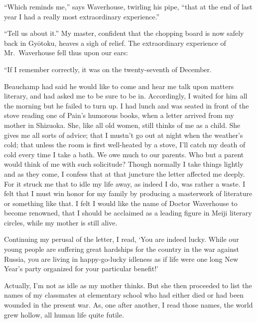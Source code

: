 \documentclass{book}
\begin{document}
``Which reminds me,'' says Waverhouse, twirling his pipe, ``that at the
end of last year I had a really most extraordinary experience.''

``Tell us about it.'' My master, confident that the chopping board is
now safely back in Gyōtoku, heaves a sigh of relief. The extraordinary
experience of Mr.~Waverhouse fell thus upon our ears:

``If I remember correctly, it was on the twenty-seventh of December.

Beauchamp had said he would like to come and hear me talk upon matters
literary, and had asked me to be sure to be in. Accordingly, I waited
for him all the morning but he failed to turn up. I had lunch and was
seated in front of the stove reading one of Pain's humorous books, when
a letter arrived from my mother in Shizuoka. She, like all old women,
still thinks of me as a child. She gives me all sorts of advice; that I
mustn't go out at night when the weather's cold; that unless the room is
first well-heated by a stove, I'll catch my death of cold every time I
take a bath. We owe much to our parents. Who but a parent would think of
me with such solicitude? Though normally I take things lightly and as
they come, I confess that at that juncture the letter affected me
deeply. For it struck me that to idle my life away, as indeed I do, was
rather a waste. I felt that I must win honor for my family by producing
a masterwork of literature or something like that. I felt I would like
the name of Doctor Waverhouse to become renowned, that I should be
acclaimed as a leading figure in Meiji literary circles, while my mother
is still alive.

Continuing my perusal of the letter, I read, `You are indeed lucky.
While our young people are suffering great hardships for the country in
the war against Russia, you are living in happy-go-lucky idleness as if
life were one long New Year's party organized for your particular
benefit!'

Actually, I'm not as idle as my mother thinks. But she then proceeded to
list the names of my classmates at elementary school who had either died
or had been wounded in the present war. As, one after another, I read
those names, the world grew hollow, all human life quite futile.
\end{document}
